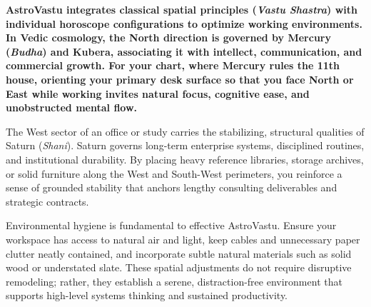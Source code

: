 
\label{topic62}

{\fontsize{9.5}{13.8}\selectfont\bfseries\color{DeepSlate} AstroVastu integrates classical spatial principles (\textit{Vastu Shastra}) with individual horoscope configurations to optimize working environments. In Vedic cosmology, the North direction is governed by Mercury (\textit{Budha}) and Kubera, associating it with intellect, communication, and commercial growth. For your chart, where Mercury rules the 11th house, orienting your primary desk surface so that you face North or East while working invites natural focus, cognitive ease, and unobstructed mental flow.}\par\vspace{2mm}

{\fontsize{9}{13}\selectfont The West sector of an office or study carries the stabilizing, structural qualities of Saturn (\textit{Shani}). Saturn governs long-term enterprise systems, disciplined routines, and institutional durability. By placing heavy reference libraries, storage archives, or solid furniture along the West and South-West perimeters, you reinforce a sense of grounded stability that anchors lengthy consulting deliverables and strategic contracts.}\par\vspace{1.8mm}

{\fontsize{9}{13}\selectfont Environmental hygiene is fundamental to effective AstroVastu. Ensure your workspace has access to natural air and light, keep cables and unnecessary paper clutter neatly contained, and incorporate subtle natural materials such as solid wood or understated slate. These spatial adjustments do not require disruptive remodeling; rather, they establish a serene, distraction-free environment that supports high-level systems thinking and sustained productivity.}\par\vspace{1.8mm}

